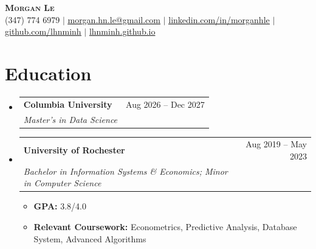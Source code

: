 \documentclass[a4paper,11pt]{article}
\makeatletter
\newcommand{\resumeItem}[1]{
  \item\small{
    {#1 \vspace{-2pt}}
  }
}
\newcommand{\resumeSubheading}[4]{
  \vspace{-2pt}\item
    \begin{tabular*}{0.97\textwidth}[t]{l@{\extracolsep{\fill}}r}
      \textbf{#1} & #2 \\
      \textit{\small#3} & \textit{\small #4} \\
    \end{tabular*}\vspace{-7pt}
}
\newcommand{\resumeSubHeadingListStart}{\begin{itemize}[leftmargin=0.15in, label={}]}
\newcommand{\resumeSubHeadingListEnd}{\end{itemize}}
\newcommand{\resumeItemListStart}{\begin{itemize}}
\newcommand{\resumeItemListEnd}{\end{itemize}\vspace{-5pt}}
\makeatother
\begin{document}
\begin{center}
  \textbf{\Huge \scshape Morgan Le} \\ \vspace{1pt}
  \small (347) 774 6979 $|$
  \href{mailto:morgan.hn.le@gmail.com}{\underline{morgan.hn.le@gmail.com}} $|$
  \href{https://www.linkedin.com/in/morganhle/}{\underline{linkedin.com/in/morganhle}} $|$
  \href{https://github.com/lhnminh}{\underline{github.com/lhnminh}} $|$
  \href{https://lhnminh.github.io/}{lhnminh.github.io}
\end{center}

\section{Education}
\resumeSubHeadingListStart
  \resumeSubheading
    {Columbia University}{Aug 2026 -- Dec 2027}
    {Master's in Data Science}{}
  \resumeSubheading
    {University of Rochester}{Aug 2019 -- May 2023}
    {Bachelor in Information Systems \& Economics; Minor in Computer Science}{}
    \resumeItemListStart
      \resumeItem{{\bfseries GPA:} 3.8/4.0}
      \resumeItem{{\bfseries Relevant Coursework:} Econometrics, Predictive Analysis, Database System, Advanced Algorithms}
    \resumeItemListEnd
\resumeSubHeadingListEnd
\end{document}
